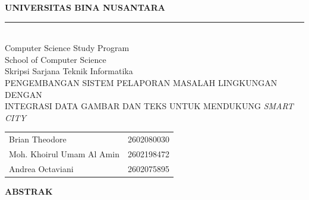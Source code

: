 \newpage
\thispagestyle{plain}
\vspace*{-1.6cm}

\begin{center}
{\selectfont\bfseries
UNIVERSITAS BINA NUSANTARA\\[0.05cm]
\rule{\textwidth}{0.8pt}\\[0.05cm]

Computer Science Study Program\\
School of Computer Science\\
Skripsi Sarjana Teknik Informatika\\[0.15cm]

PENGEMBANGAN SISTEM PELAPORAN MASALAH LINGKUNGAN DENGAN\\
INTEGRASI DATA GAMBAR DAN TEKS UNTUK MENDUKUNG \textit{SMART CITY}\\[0.2cm]
}

{\selectfont\bfseries
\begin{tabular}{p{7cm} l}
Brian Theodore & 2602080030 \\[0.05cm]
Moh. Khoirul Umam Al Amin & 2602198472 \\[0.05cm]
Andrea Octaviani & 2602075895
\end{tabular}
}
\end{center}

\vspace{0.15cm}

\begin{center}
{\fontsize{16pt}{18pt}\selectfont\bfseries ABSTRAK}
\end{center}

